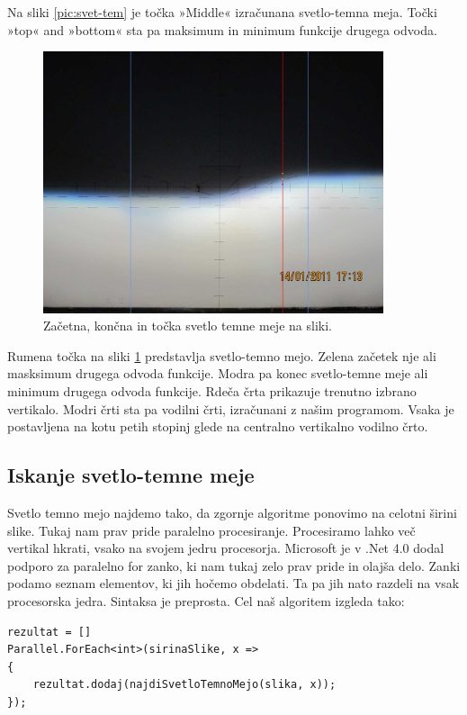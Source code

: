 \documentclass[oneside, a4paper, 12pt]{book}
\begin{document}
Na sliki \ref{pic:svet-tem} je točka »Middle« izračunana svetlo-temna meja. Točki »top« and »bottom« sta pa maksimum in minimum funkcije drugega odvoda. 


\begin{figure}
\begin{center}
\includegraphics[width=10cm]{slike/svetlo-temna-meja-orig.jpg}
\end{center}
\caption{Začetna, končna in točka svetlo temne meje na sliki.}
\label{pic:svet-tem2}
\end{figure}

Rumena točka na sliki \ref{pic:svet-tem2} predstavlja svetlo-temno mejo. Zelena začetek nje ali masksimum drugega odvoda funkcije. Modra pa konec svetlo-temne meje ali minimum drugega odvoda funkcije. Rdeča črta prikazuje trenutno izbrano vertikalo. Modri črti sta pa vodilni črti, izračunani z našim programom. Vsaka je postavljena na kotu petih stopinj glede na centralno vertikalno vodilno črto. 


\subsection{Iskanje svetlo-temne meje}
\label{ch:iskanj-sv-t-m}
Svetlo temno mejo najdemo tako, da zgornje algoritme ponovimo na celotni širini slike. Tukaj nam prav pride paralelno procesiranje. Procesiramo lahko več vertikal hkrati, vsako na svojem jedru procesorja. Microsoft je v .Net 4.0 dodal podporo za paralelno for zanko, ki nam tukaj zelo prav pride in olajša delo. Zanki podamo seznam elementov, ki jih hočemo obdelati. Ta pa jih nato razdeli na vsak procesorska jedra. Sintaksa je preprosta. Cel naš algoritem izgleda tako:

\begin{verbatim}
rezultat = []
Parallel.ForEach<int>(sirinaSlike, x =>
{
    rezultat.dodaj(najdiSvetloTemnoMejo(slika, x));
});
\end{verbatim}
\end{document}
